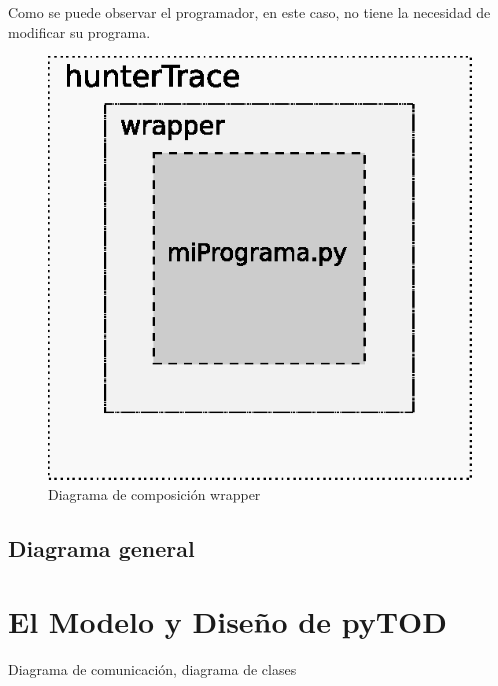 \documentclass[12pt,legalpaper]{report}
\begin{document}
Como se puede observar el programador, en este caso, no tiene la necesidad de modificar su programa.

\begin{figure}[h]
	\centering
	\includegraphics[scale=1]{images/wrapper.eps}
	\caption{Diagrama de composición wrapper}
\end{figure}
		
		\subsection{Diagrama general}
	
	
	\section{El Modelo y Diseño de pyTOD}
	
	Diagrama de comunicación, diagrama de clases
	
\end{document}
